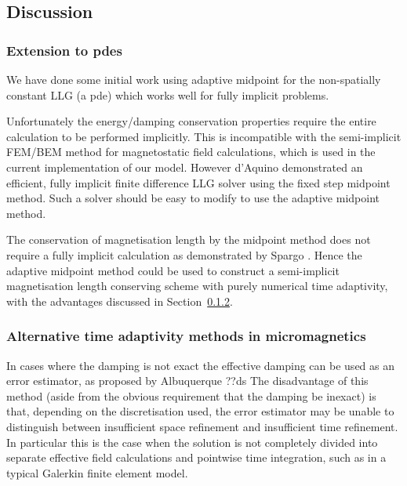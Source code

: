 \subsection{Discussion}

\subsubsection{Extension to pdes}

We have done some initial work using adaptive midpoint for the non-spatially constant LLG (\ie a pde) which works well for fully implicit problems.

Unfortunately the energy/damping conservation properties require the entire calculation to be performed implicitly.
This is incompatible with the semi-implicit FEM/BEM method for magnetostatic field calculations,\cite{Koehler1997} which is used in the current implementation of our model.
However d'Aquino \etal demonstrated an efficient, fully implicit finite difference LLG solver using the fixed step midpoint method\cite{DAquino2005}.
Such a solver should be easy to modify to use the adaptive midpoint method.

The conservation of magnetisation length by the midpoint method does not require a fully implicit calculation as demonstrated by Spargo \etal\cite{Spargo2003a}.
Hence the adaptive midpoint method could be used to construct a semi-implicit magnetisation length conserving scheme with purely numerical time adaptivity, with the advantages discussed in Section~\ref{sec:altern-time-adapt}.


\subsubsection{Alternative time adaptivity methods in micromagnetics}
\label{sec:altern-time-adapt}

In cases where the damping is not exact the effective damping can be used as an error estimator, as proposed by Albuquerque \etal\cite{Albuquerque2001}
??ds The disadvantage of this method (aside from the obvious requirement that the damping be inexact) is that, depending on the discretisation used, the error estimator may be unable to distinguish between insufficient space refinement and insufficient time refinement.
In particular this is the case when the solution is not completely divided into separate effective field calculations and pointwise time integration, such as in a typical Galerkin finite element model.

